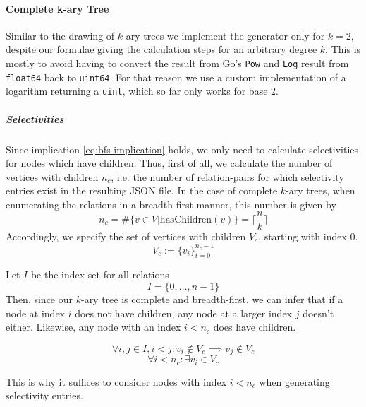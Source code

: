 \setlength{\belowdisplayskip}{10pt}
\setlength{\belowdisplayshortskip}{50pt}
\setlength{\abovedisplayskip}{10pt}
\setlength{\abovedisplayshortskip}{10pt}

\paragraph{Complete k-ary Tree}

\begin{note}
    Similar to the drawing of $k$-ary trees we implement the generator only for $k=2$, despite our formulae giving the calculation steps for an arbitrary degree $k$. This is mostly to avoid having to convert the result from Go's \texttt{Pow} and \texttt{Log} result from \texttt{float64} back to \texttt{uint64}. For that reason we use a custom implementation of a logarithm returning a \texttt{uint}, which so far only works for base 2.
\end{note}

\subparagraph{Selectivities}
Since implication \ref{eq:bfs-implication} holds, we only need to calculate selectivities for nodes which have children.
Thus, first of all, we calculate the number of vertices with children $n_c$, i.e. the number of relation-pairs for which selectivity entries exist in the resulting JSON file.
In the case of complete $k$-ary trees, when enumerating the relations in a breadth-first manner, this number is given by 
\begin{equation}
    n_{c} = \#\{v \in V \vert \text{hasChildren}(v)\} = \lceil\frac{n}{k}\rceil
\end{equation}
Accordingly, we specify the set of vertices with children $V_c$, starting with index 0.
\begin{equation}
   V_c := \{v_i\}_{i=0}^{n_{c}-1}
\end{equation} 

\begin{note}
Let $I$ be the index set for all relations
\begin{equation}
    I = \{0,\ldots,n-1\}
\end{equation}
Then, since our $k$-ary tree is complete and breadth-first, we can infer that if a node at index $i$ does not have children, any node at a larger index $j$ doesn't either. Likewise, any node with an index $i < n_c$ does have children. 

\begin{equation}
    \forall i,j \in I, i < j \colon v_i \notin V_c \implies v_j \notin V_c
\end{equation}
\begin{equation}
    \forall i < n_c \colon \exists v_i \in V_c
\end{equation}

This is why it suffices to consider nodes with index $i < n_c$ when generating selectivity entries.
\end{note}

